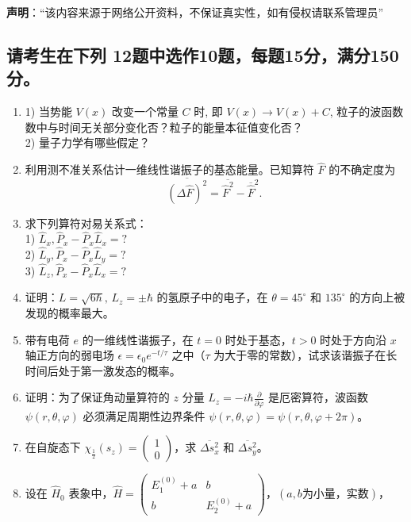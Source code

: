 
\textbf{声明}：“该内容来源于网络公开资料，不保证真实性，如有侵权请联系管理员”

\subsection{请考生在下列 12题中选作10题，每题15分，满分150分。}
\begin{enumerate}
    \item 1) 当势能 $V(x)$ 改变一个常量 $C$ 时, 即 $V(x) \rightarrow V(x) + C$, 粒子的波函数数中与时间无关部分变化否？粒子的能量本征值变化否？\\
   2) 量子力学有哪些假定？
    \item 利用测不准关系估计一维线性谐振子的基态能量。已知算符 $\hat{F}$ 的不确定度为
    \[
    \overline{(\Delta \hat{F})^2} = \overline{\hat{F}^2}-  \overline{\hat{F}} ^2.~
    \]
    \item 求下列算符对易关系式：\\
    1) $\hat{L}_x, \hat{P}_x - \hat{P}_x \hat{L}_x=?$\\
    2) $\hat{L}_y, \hat{P}_x - \hat{P}_x \hat{L}_y=?$\\
    3) $\hat{L}_z, \hat{P}_x - \hat{P}_x \hat{L}_x=?$\\
    \item 证明：$L = \sqrt{6\hbar}, \, L_z = \pm \hbar$ 的氢原子中的电子，在 $\theta = 45^\circ$ 和 $135^\circ$ 的方向上被发现的概率最大。
    \item 带有电荷 $e$ 的一维线性谐振子，在 $t = 0$ 时处于基态，$t > 0$ 时处于方向沿 $x$ 轴正方向的弱电场 $\epsilon = \epsilon_0 e^{-t/\tau}$ 之中（$\tau$ 为大于零的常数），试求该谐振子在长时间后处于第一激发态的概率。
    \item 证明：为了保证角动量算符的 $z$ 分量 $L_z = -i\hbar \frac{\partial}{\partial \varphi}$ 是厄密算符，波函数 $\psi(r, \theta, \varphi)$ 必须满足周期性边界条件 $\psi(r, \theta, \varphi) = \psi(r, \theta, \varphi + 2\pi)$。
    \item 在自旋态下 $\chi_{\frac{1}{2}}(s_z) = \begin{pmatrix} 1 \\ 0 \end{pmatrix}$，求 $\overline{\Delta s_x^2}$ 和 $\overline{\Delta s_y^2}$。
    \item 设在 $\hat H_0$ 表象中，$\hat{H} = \begin{pmatrix} E_1^{(0)} + a & b \\ b & E_2^{(0)} + a \end{pmatrix}$，$(a, b \text{为小量，实数})$，\\\\

\end{enumerate}
